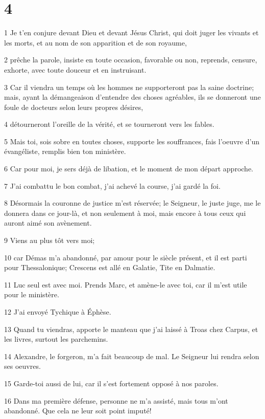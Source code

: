 \chapter{4}

\par 1 Je t'en conjure devant Dieu et devant Jésus Christ, qui doit juger les vivants et les morts, et au nom de son apparition et de son royaume,
\par 2 prêche la parole, insiste en toute occasion, favorable ou non, reprends, censure, exhorte, avec toute douceur et en instruisant.
\par 3 Car il viendra un temps où les hommes ne supporteront pas la saine doctrine; mais, ayant la démangeaison d'entendre des choses agréables, ils se donneront une foule de docteurs selon leurs propres désires,
\par 4 détourneront l'oreille de la vérité, et se tourneront vers les fables.
\par 5 Mais toi, sois sobre en toutes choses, supporte les souffrances, fais l'oeuvre d'un évangéliste, remplis bien ton ministère.
\par 6 Car pour moi, je sers déjà de libation, et le moment de mon départ approche.
\par 7 J'ai combattu le bon combat, j'ai achevé la course, j'ai gardé la foi.
\par 8 Désormais la couronne de justice m'est réservée; le Seigneur, le juste juge, me le donnera dans ce jour-là, et non seulement à moi, mais encore à tous ceux qui auront aimé son avènement.
\par 9 Viens au plus tôt vers moi;
\par 10 car Démas m'a abandonné, par amour pour le siècle présent, et il est parti pour Thessalonique; Crescens est allé en Galatie, Tite en Dalmatie.
\par 11 Luc seul est avec moi. Prends Marc, et amène-le avec toi, car il m'est utile pour le ministère.
\par 12 J'ai envoyé Tychique à Éphèse.
\par 13 Quand tu viendras, apporte le manteau que j'ai laissé à Troas chez Carpus, et les livres, surtout les parchemins.
\par 14 Alexandre, le forgeron, m'a fait beaucoup de mal. Le Seigneur lui rendra selon ses oeuvres.
\par 15 Garde-toi aussi de lui, car il s'est fortement opposé à nos paroles.
\par 16 Dans ma première défense, personne ne m'a assisté, mais tous m'ont abandonné. Que cela ne leur soit point imputé!
